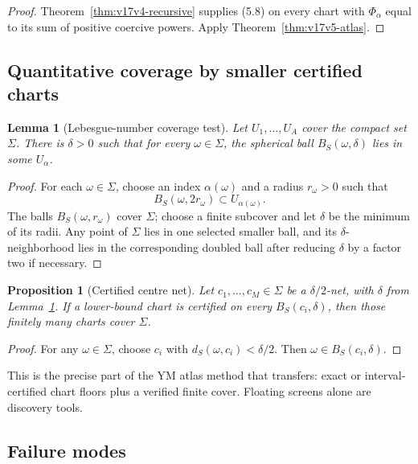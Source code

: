 \documentclass[11pt]{article}
\newtheorem{proposition}[theorem]{Proposition}
\newtheorem{lemma}[theorem]{Lemma}
\theoremstyle{remark}
\begin{document}
\begin{proof}
Theorem~\ref{thm:v17v4-recursive} supplies (5.8) on every chart with
\(\Phi_\alpha\) equal to its sum of positive coercive powers.
Apply Theorem~\ref{thm:v17v5-atlas}.
\end{proof}

\subsection{Quantitative coverage by smaller certified charts}

\begin{lemma}[Lebesgue-number coverage test]
\label{lem:v17v5-lebesgue}
Let \(U_1,\ldots,U_A\) cover the compact set \(\Sigma\).  There is
\(\delta>0\) such that for every \(\omega\in\Sigma\), the spherical
ball \(B_{S}(\omega,\delta)\) lies in some \(U_\alpha\).
\end{lemma}

\begin{proof}
For each \(\omega\in\Sigma\), choose an index \(\alpha(\omega)\) and
a radius \(r_\omega>0\) such that
\[
 B_S(\omega,2r_\omega)\subset U_{\alpha(\omega)}.
\]
The balls \(B_S(\omega,r_\omega)\) cover \(\Sigma\); choose a finite
subcover and let \(\delta\) be the minimum of its radii.  Any point
of \(\Sigma\) lies in one selected smaller ball, and its
\(\delta\)-neighborhood lies in the corresponding doubled ball after
reducing \(\delta\) by a factor two if necessary.
\end{proof}

\begin{proposition}[Certified centre net]
\label{prop:v17v5-net}
Let \(c_1,\ldots,c_M\in\Sigma\) be a
\(\delta/2\)-net, with \(\delta\) from
Lemma~\ref{lem:v17v5-lebesgue}.  If a lower-bound chart is certified
on every \(B_S(c_i,\delta)\), then those finitely many charts cover
\(\Sigma\).
\end{proposition}

\begin{proof}
For any \(\omega\in\Sigma\), choose \(c_i\) with
\(d_S(\omega,c_i)<\delta/2\).  Then
\(\omega\in B_S(c_i,\delta)\).
\end{proof}

This is the precise part of the YM atlas method that transfers: exact
or interval-certified chart floors plus a verified finite cover.
Floating screens alone are discovery tools.

\subsection{Failure modes}
\end{document}
